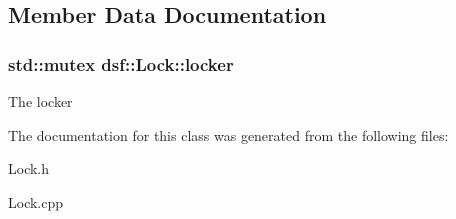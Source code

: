 \subsection{Member Data Documentation}
\hypertarget{classdsf_1_1_lock_a605f27e33e37dc8b3b920a3272461c44}{}
\subsubsection[{locker}]{\setlength{\rightskip}{0pt plus 5cm}std\+::mutex dsf\+::\+Lock\+::locker\hspace{0.3cm}{\ttfamily [protected]}}\label{classdsf_1_1_lock_a605f27e33e37dc8b3b920a3272461c44}
The locker 

The documentation for this class was generated from the following files\+:\begin{DoxyCompactItemize}
\item 
Lock.\+h\item 
Lock.\+cpp\end{DoxyCompactItemize}
